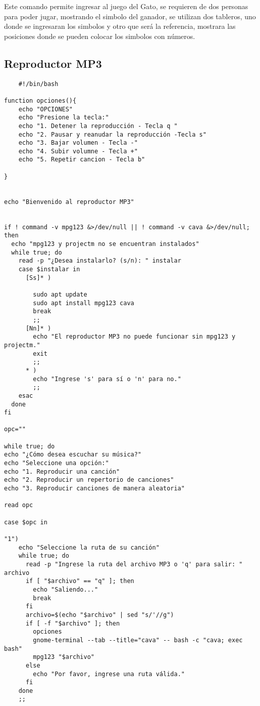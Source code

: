 \documentclass{article}
\begin{document}
\vspace{1cm}
\fontsize{12}{6}\selectfont
\textbf{}
Este comando permite ingresar al juego del Gato, se requieren de dos personas para poder jugar, mostrando el simbolo del ganador, se utilizan dos tableros, uno donde se ingresaran los simbolos y otro que será la referencia, mostrara las posiciones donde se pueden colocar los simbolos con números. 


\newpage
\subsection{Reproductor MP3}
\fontsize{6}{4.5}
\begin{verbatim}
    #!/bin/bash

function opciones(){
    echo "OPCIONES"
    echo "Presione la tecla:"
    echo "1. Detener la reproducción - Tecla q "
    echo "2. Pausar y reanudar la reproducción -Tecla s"
    echo "3. Bajar volumen - Tecla -"
    echo "4. Subir volumne - Tecla +"
    echo "5. Repetir cancion - Tecla b"

}


echo "Bienvenido al reproductor MP3"


if ! command -v mpg123 &>/dev/null || ! command -v cava &>/dev/null; then
  echo "mpg123 y projectm no se encuentran instalados"
  while true; do
    read -p "¿Desea instalarlo? (s/n): " instalar
    case $instalar in
      [Ss]* )
        
        sudo apt update
        sudo apt install mpg123 cava 
        break
        ;;
      [Nn]* )
        echo "El reproductor MP3 no puede funcionar sin mpg123 y projectm."
        exit
        ;;
      * )
        echo "Ingrese 's' para sí o 'n' para no."
        ;;
    esac
  done
fi

opc=""

while true; do
echo "¿Cómo desea escuchar su música?" 
echo "Seleccione una opción:"
echo "1. Reproducir una canción"
echo "2. Reproducir un repertorio de canciones"
echo "3. Reproducir canciones de manera aleatoria"

read opc

case $opc in

"1")
    echo "Seleccione la ruta de su canción"
    while true; do
      read -p "Ingrese la ruta del archivo MP3 o 'q' para salir: " archivo
      if [ "$archivo" == "q" ]; then
        echo "Saliendo..."
        break
      fi
      archivo=$(echo "$archivo" | sed "s/'//g")
      if [ -f "$archivo" ]; then
        opciones
        gnome-terminal --tab --title="cava" -- bash -c "cava; exec bash"
        mpg123 "$archivo"
      else
        echo "Por favor, ingrese una ruta válida."
      fi
    done
    ;;


\end{verbatim}
\end{document}
